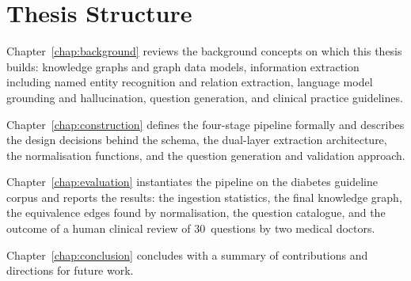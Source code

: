 \section{Thesis Structure}
\label{sec:structure}

Chapter~\ref{chap:background} reviews the background concepts on which this
thesis builds: knowledge graphs and graph data models, information
extraction including named entity recognition and relation extraction,
language model grounding and hallucination, question generation, and
clinical practice guidelines.

Chapter~\ref{chap:construction} defines the four-stage pipeline formally
and describes the design decisions behind the schema, the dual-layer
extraction architecture, the normalisation functions, and the question
generation and validation approach.

Chapter~\ref{chap:evaluation} instantiates the pipeline on the diabetes
guideline corpus and reports the results: the ingestion statistics, the
final knowledge graph, the equivalence edges found by normalisation, the
question catalogue, and the outcome of a human clinical review of
30~questions by two medical doctors.

Chapter~\ref{chap:conclusion} concludes with a summary of contributions and
directions for future work.